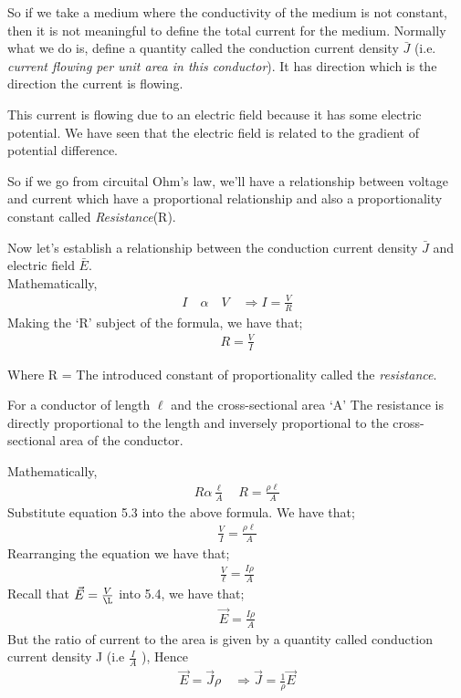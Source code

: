 So if we take a medium where the conductivity of the medium is not constant, then it is not meaningful to define the total current for the medium. Normally what we do is, define a quantity called the conduction current density $ \bar{J} $ (i.e. \emph{current flowing per unit area in this conductor}). It has direction which is the direction the current is flowing. 

This current is flowing due to an electric field because it has some electric potential. We have seen that the electric field is related to the gradient of potential difference.

So if we go from circuital Ohm's law, we'll have a relationship between voltage and current which have a proportional relationship and also a proportionality constant called \emph{Resistance}(R).

Now let's establish a relationship between the conduction current density $ \bar{J} $ and electric field $ \bar{E} $. \\
Mathematically, 
\begin{align*}
I\quad\alpha\quad V \quad\Rightarrow I = \frac{V}{R}
\end{align*} 
Making the `R' subject of the formula, we have that; 
\begin{align}
R = \frac{V}{I} 
\end{align}
\begin{center}
Where R = The introduced constant of proportionality called the \textit{resistance}.
\end{center}
For a conductor of length $\ell$ and the cross-sectional area `A' The resistance is directly proportional to the length and inversely proportional to the cross-sectional area of the conductor.

Mathematically, 
\begin{align*}
R \alpha \frac{\ell}{A}\quad R = \frac{\rho\ell}{A}
\end{align*}
Substitute equation 5.3 into the above formula. We have that;
\begin{align*}
\frac{V}{I} = \frac{\rho\ell}{A}
\end{align*}
Rearranging the equation we have that; 
\begin{align}
\frac{V}{\ell} = \frac{I\rho}{A}
\end{align}
Recall that $\vec{E} = \frac{V}{\L}$ into 5.4, we have that;
\begin{align*}
\vec{E} = \frac{I\rho}{A}
\end{align*}
But the ratio of current to the area is given by a quantity called conduction current density J (i.e $ \frac{I}{A} $ ), Hence
\begin{align*}
\vec{E} = \vec{J}\rho \quad \Rightarrow \vec{J}=\frac{1}{\rho}\vec{E}
\end{align*}

